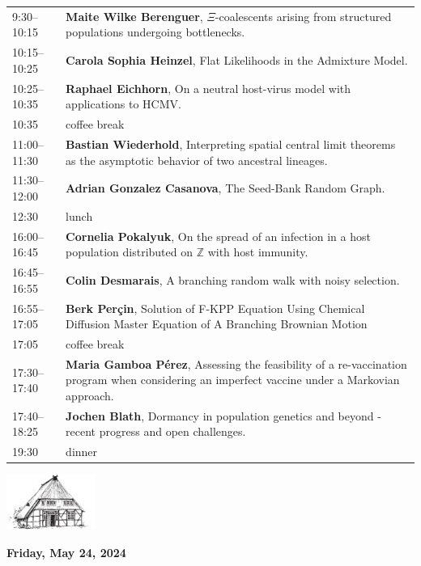 \documentclass[12pt,a4paper]{article}
\newcommand{\Kopf}{%
\begin{center}%
\includegraphics[width=.2\textwidth]{logo-tsh}\\[2ex]
\end{center}
}
\begin{document}
\begin{tabular}{@{}l p{}@{}}
%
9:30--10:15 &  \textbf{Maite Wilke Berenguer}, 
                $\Xi$-coalescents arising from structured populations undergoing bottlenecks. \\ 
10:15--10:25 & \textbf{Carola Sophia Heinzel}, 
                Flat Likelihoods in the Admixture Model. \\          
10:25--10:35 &  \textbf{Raphael Eichhorn},
                On a neutral host-virus model with applications to HCMV. \\ 
10:35 & coffee break  \\  
11:00--11:30 &  \textbf{Bastian Wiederhold}, 
                Interpreting spatial central limit theorems as the asymptotic behavior of two ancestral lineages. \\
11:30--12:00 &  \textbf{Adrian Gonzalez Casanova}, 
                The Seed-Bank Random Graph.\\
12:30 & lunch  \\  
16:00--16:45 & \textbf{Cornelia Pokalyuk}, 
                On the spread of an infection in a host population distributed on $\mathbb{Z}$ with host immunity.\\ 
16:45--16:55 & \textbf{Colin Desmarais}, 
                A branching random walk with noisy selection. \\
16:55--17:05 & \textbf{Berk Perçin},
                Solution of F-KPP Equation Using Chemical Diffusion Master Equation of A Branching Brownian Motion \\
17:05 & coffee break  \\  
17:30--17:40 & \textbf{Maria Gamboa Pérez}, 
                Assessing the feasibility of a re-vaccination program when considering an imperfect vaccine under a Markovian approach. \\
17:40--18:25 & \textbf{Jochen Blath}, 
                Dormancy in population genetics and beyond - recent progress and open challenges. \\
19:30 & dinner
\end{tabular}

\newpage

\Kopf
\vspace*{.75cm}

\textbf{\Large Friday, May 24, 2024}\medskip
\end{document}
